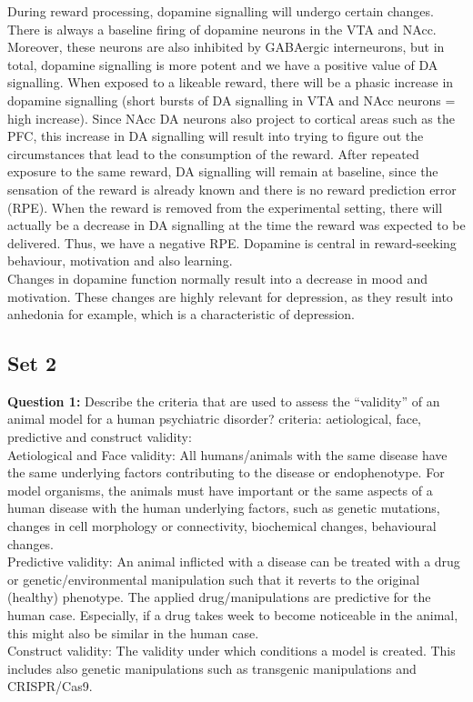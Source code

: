 \documentclass[twosided, a4paper, pt11]{article}
\begin{document}
	During reward processing, dopamine signalling will undergo certain changes. There is always a baseline firing of dopamine neurons in the VTA and NAcc. Moreover, these neurons are also inhibited by GABAergic interneurons, but in total, dopamine signalling is more potent and we have a positive value of DA signalling. When exposed to a likeable reward, there will be a phasic increase in dopamine signalling (short bursts of DA signalling in VTA and NAcc neurons = high increase). Since NAcc DA neurons also project to cortical areas such as the PFC, this increase in DA signalling will result into trying to figure out the circumstances that lead to the consumption of the reward. After repeated exposure to the same reward, DA signalling will remain at baseline, since the sensation of the reward is already known and there is no reward prediction error (RPE). When the reward is removed from the experimental setting, there will actually be a decrease in DA signalling at the time the reward was expected to be delivered. Thus, we have a negative RPE. Dopamine is central in reward-seeking behaviour, motivation and also learning.\\
	Changes in dopamine function normally result into a decrease in mood and motivation. These changes are highly relevant for depression, as they result into anhedonia for example, which is a characteristic of depression.\newline
	
	\subsection{Set 2}	
	\textbf{Question 1:} Describe the criteria that are used to assess the “validity” of an animal model for a human psychiatric disorder? criteria: aetiological, face, predictive and construct validity: \\
	Aetiological and Face validity: All humans/animals with the same disease have the same underlying factors contributing to the disease or endophenotype. For model organisms, the animals must have important or the same aspects of a human disease with the human underlying factors, such as genetic mutations, changes in cell morphology or connectivity, biochemical changes, behavioural changes.\\
	Predictive validity: An animal inflicted with a disease can be treated with a drug or genetic/environmental manipulation such that it reverts to the original (healthy) phenotype. The applied drug/manipulations are predictive for the human case. Especially, if a drug takes week to become noticeable in the animal, this might also be similar in the human case.\\
	Construct validity: The validity under which conditions a model is created. This includes also genetic manipulations such as transgenic manipulations and CRISPR/Cas9.\newline
	
\end{document}
